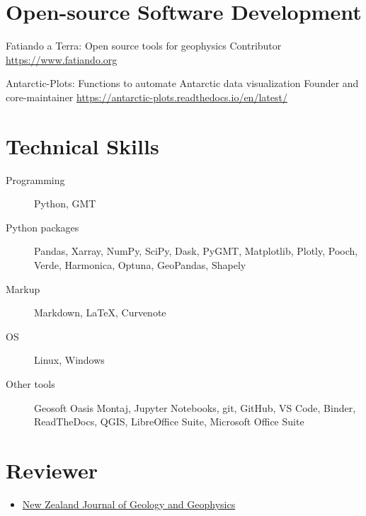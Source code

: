 \documentclass{ExpressiveResume}
\begin{document}

\section{Open-source Software Development}
\begin{cventries}
    {Fatiando a Terra: Open source tools for geophysics}
    {Contributor \newline \url{https://www.fatiando.org}}

    {Antarctic-Plots: Functions to automate Antarctic data visualization}
    {Founder and core-maintainer \newline \url{https://antarctic-plots.readthedocs.io/en/latest/}}
\end{cventries}


\section{Technical Skills}
\begin{description}
    \item[Programming] Python, GMT
    \item[Python packages] Pandas, Xarray, NumPy, SciPy, Dask, PyGMT,
        Matplotlib, Plotly, Pooch, Verde, Harmonica, Optuna, GeoPandas, Shapely
    \item[Markup] Markdown, \LaTeX, Curvenote
    \item[OS] Linux, Windows
    \item[Other tools] Geosoft Oasis Montaj, Jupyter Notebooks, git,
        GitHub, VS Code, Binder,
        ReadTheDocs, QGIS, LibreOffice Suite, Microsoft Office Suite
\end{description}


\section{Reviewer}
\begin{itemize}[label={}, leftmargin=*]
    \item \href{https://www.tandfonline.com/toc/tnzg20/current}{New
              Zealand Journal of Geology and Geophysics}
\end{itemize}
\end{document}
